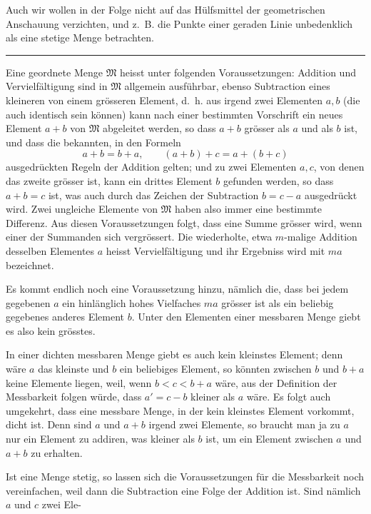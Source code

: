 
Auch wir wollen in der Folge nicht auf das Hülfsmittel der
geometrischen Anschauung verzichten, und z.~B. die Punkte einer
geraden Linie unbedenklich als eine stetige Menge betrachten.

\begin{center}
\rule{0.18\linewidth}{0.4pt}
\end{center}

Eine geordnete Menge $\mathfrak M$ heisst  unter
folgenden Voraussetzungen: Addition und Vervielfältigung sind in
$\mathfrak M$ allgemein ausführbar, ebenso Subtraction eines kleineren
von einem grösseren Element, d.~h. aus irgend zwei Elementen $a,b$
(die auch identisch sein können) kann nach einer bestimmten Vorschrift
ein neues Element $a+b$ von $\mathfrak M$ abgeleitet werden, so dass
$a+b$ grösser als $a$ und als $b$ ist, und dass die bekannten, in den
Formeln
\[
 a+b=b+a,
 \qquad (a+b)+c=a+(b+c)
\]
ausgedrückten Regeln der Addition gelten; und zu zwei Elementen $a,c$,
von denen das zweite grösser ist, kann ein drittes Element $b$
gefunden werden, so dass $a+b=c$ ist, was auch durch das Zeichen der
Subtraction $b=c-a$ ausgedrückt wird. Zwei ungleiche Elemente von
$\mathfrak M$ haben also immer eine bestimmte Differenz. Aus diesen
Voraussetzungen folgt, dass eine Summe grösser wird, wenn einer der
Summanden sich vergrössert. Die wiederholte, etwa $m$-malige Addition
desselben Elementes $a$ heisst Vervielfältigung und ihr Ergebniss wird
mit $ma$ bezeichnet.

Es kommt endlich noch eine Voraussetzung hinzu, nämlich die, dass bei
jedem gegebenen $a$ ein hinlänglich hohes Vielfaches $ma$ grösser ist
als ein beliebig gegebenes anderes Element $b$. Unter den Elementen
einer messbaren Menge giebt es also kein grösstes.

In einer dichten messbaren Menge giebt es auch kein kleinstes Element;
denn wäre $a$ das kleinste und $b$ ein beliebiges Element, so könnten
zwischen $b$ und $b+a$ keine Elemente liegen, weil, wenn $b<c<b+a$
wäre, aus der Definition der Messbarkeit folgen würde, dass $a'=c-b$
kleiner als $a$ wäre. Es folgt auch umgekehrt, dass eine messbare
Menge, in der kein kleinstes Element vorkommt, dicht ist. Denn sind
$a$ und $a+b$ irgend zwei Elemente, so braucht man ja zu $a$ nur ein
Element zu addiren, was kleiner als $b$ ist, um ein Element zwischen
$a$ und $a+b$ zu erhalten.

Ist eine Menge stetig, so lassen sich die Voraussetzungen für die
Messbarkeit noch vereinfachen, weil dann die Subtraction eine Folge
der Addition ist. Sind nämlich $a$ und $c$ zwei Ele-
